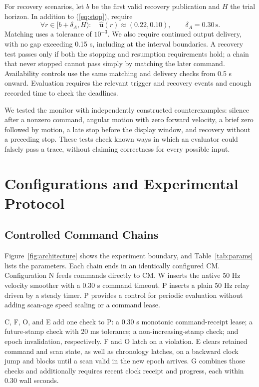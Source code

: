 \documentclass[conference]{IEEEtran}
\begin{document}
For recovery scenarios, let $b$ be the first valid recovery publication and $H$ the trial horizon. In addition to (\ref{eq:stop}), require
\begin{equation}
\forall r\in[b+\delta_A,H):\quad
\hat{\mathbf{u}}(r)\approx(0.22,0.10),\qquad \delta_A=0.30\,\mathrm{s}.
\end{equation}
Matching uses a tolerance of $10^{-3}$. We also require continued output delivery, with no gap exceeding 0.15 s, including at the interval boundaries. A recovery test passes only if both the stopping and resumption requirements hold; a chain that never stopped cannot pass simply by matching the later command. Availability controls use the same matching and delivery checks from 0.5 s onward. Evaluation requires the relevant trigger and recovery events and enough recorded time to check the deadlines.

We tested the monitor with independently constructed counterexamples: silence after a nonzero command, angular motion with zero forward velocity, a brief zero followed by motion, a late stop before the display window, and recovery without a preceding stop. These tests check known ways in which an evaluator could falsely pass a trace, without claiming correctness for every possible input.

\section{Configurations and Experimental Protocol}
\subsection{Controlled Command Chains}
Figure~\ref{fig:architecture} shows the experiment boundary, and Table~\ref{tab:params} lists the parameters. Each chain ends in an identically configured CM. Configuration N feeds commands directly to CM. W inserts the native 50 Hz velocity smoother with a 0.30 s command timeout. P inserts a plain 50 Hz relay driven by a steady timer. P provides a control for periodic evaluation without adding scan-age speed scaling or a command lease.

C, F, O, and E add one check to P: a 0.30 s monotonic command-receipt lease; a future-stamp check with 20 ms tolerance; a non-increasing-stamp check; and epoch invalidation, respectively. F and O latch on a violation. E clears retained command and scan state, as well as chronology latches, on a backward clock jump and blocks until a scan valid in the new epoch arrives. G combines those checks and additionally requires recent clock receipt and progress, each within 0.30 wall seconds.
\end{document}
